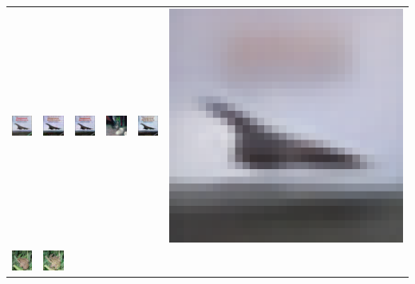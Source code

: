 \begin{table}[h!]
{\begin{tabular}{cccccc}
        \includegraphics[width=.145\textwidth]{chapter4/figures/images/cifar10/original/4.png} &   
        \includegraphics[width=.145\textwidth]{chapter4/figures/images/cifar10/reconstruction/4.png} &
        \includegraphics[width=.145\textwidth]{chapter4/figures/images/cifar10/corrected_reconstruction/4.png} &
        \includegraphics[width=.145\textwidth]{chapter4/figures/images/cifar10/diffusion_decoder_beta_0.01/4.png} &
        \includegraphics[width=.145\textwidth]{chapter4/figures/images/cifar10/diffusion_decoder_beta_0/4.png} &
        \includegraphics[width=.145\textwidth]{chapter4/figures/images/cifar10/VAE_reconstruction/4.png} \\
        \includegraphics[width=.145\textwidth]{chapter4/figures/images/cifar10/original/5.png} &   
        \includegraphics[width=.145\textwidth]{chapter4/figures/images/cifar10/reconstruction/5.png} &

\end{tabular}}
\end{table}
